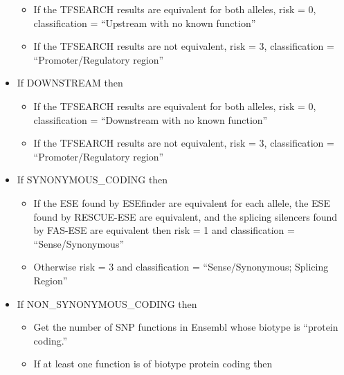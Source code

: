 \documentclass[11pt]{article}
\begin{document}
\begin{itemize}
\begin{itemize}
\item If the TFSEARCH results are equivalent for both alleles, risk = 0, classification = ``Upstream with no known function''\\
\label{sec-4-4-2-7-1}%
\item If the TFSEARCH results are not equivalent, risk = 3, classification = ``Promoter/Regulatory region''\\
\label{sec-4-4-2-7-2}%
\end{itemize} %

\item If DOWNSTREAM then\\
\label{sec-4-4-2-8}%
\begin{itemize}

\item If the TFSEARCH results are equivalent for both alleles, risk = 0, classification = ``Downstream with no known function''\\
\label{sec-4-4-2-8-1}%
\item If the TFSEARCH results are not equivalent, risk = 3, classification = ``Promoter/Regulatory region''\\
\label{sec-4-4-2-8-2}%
\end{itemize} %

\item If SYNONYMOUS\_CODING then\\
\label{sec-4-4-2-9}%
\begin{itemize}

\item If the ESE found by ESEfinder are equivalent for each allele, the ESE found by RESCUE-ESE are equivalent, and the splicing silencers found by FAS-ESE are equivalent then risk = 1 and classification = ``Sense/Synonymous''\\
\label{sec-4-4-2-9-1}%
\item Otherwise risk = 3 and classification = ``Sense/Synonymous; Splicing Region''\\
\label{sec-4-4-2-9-2}%
\end{itemize} %

\item If NON\_SYNONYMOUS\_CODING then\\
\label{sec-4-4-2-10}%
\begin{itemize}

\item Get the number of SNP functions in Ensembl whose biotype is ``protein coding.''\\
\label{sec-4-4-2-10-1}%
\item If at least one function is of biotype protein coding then\\
\label{sec-4-4-2-10-2}%
\begin{itemize}


\end{itemize}
\end{itemize}
\end{itemize}
\end{document}
